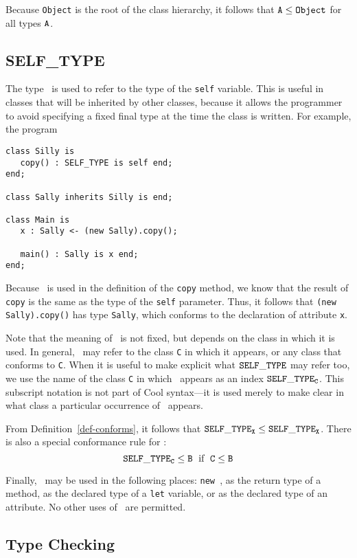 Because {\tt Object} is the root of the class hierarchy, it follows that
$\tt A \leq Object$ for all types $\tt A$.

\subsection{SELF\_TYPE}

The type \styp\ is used to refer to the type of the {\tt self}
variable.  This is useful in classes that will be inherited by other
classes, because it allows the programmer to avoid specifying
a fixed final type at the time the class is written.  For example,
the program
\begin{verbatim}
class Silly is
   copy() : SELF_TYPE is self end;
end;

class Sally inherits Silly is end;

class Main is
   x : Sally <- (new Sally).copy();

   main() : Sally is x end;
end;
\end{verbatim}
Because \styp\ is used in the definition of the {\tt copy} method,
we know that the result of {\tt copy} is  the same as the 
type of the {\tt self}
parameter.  Thus, it follows that {\tt (new Sally).copy()} has
type {\tt Sally}, which conforms to the declaration of attribute {\tt x}.

Note that the meaning of \styp\ is not fixed, but depends on the class
in which it is used.  In general, \styp\ may refer to the class {\tt C}
in which it appears, or any class that conforms to {\tt C}.  When it is
useful to make explicit what ${\tt SELF\_TYPE}$ may refer too, we use the 
name of the class {\tt C} in which \styp\ appears as an index ${\tt SELF\_TYPE}_{\tt C}$.
This subscript notation is not part of Cool syntax---it is used merely
to make clear in what class a particular occurrence of \styp\ appears.

From Definition~\ref{def-conforms}, it follows that
${\tt SELF\_TYPE}_{\tt X} \leq {\tt SELF\_TYPE}_{\tt X}$.
There is also a special conformance rule for \styp:
\[ \tt {\tt SELF\_TYPE}_C \leq B \;\mbox{\rm\ if\ }\; C \leq B \]

Finally, \styp\ may be used in the following places: {\tt new \styp},
as the return type of a method, as the declared type of a {\tt let}
variable, or as the declared type of an attribute. No other uses of
\styp\ are permitted.

\subsection{Type Checking}

